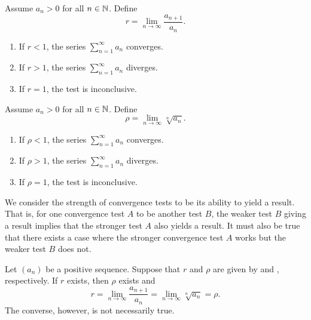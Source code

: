 \begin{proposition}
  Assume $a_n > 0$ for all $n \in \mathbb N$. Define
  \[ r = \lim_{n \to \infty} \frac{a_{n + 1}}{a_n}. \]
  \begin{enumerate}
    \item If $r < 1$, the series $\sum_{n = 1}^{\infty} a_n$ converges.
    \item If $r > 1$, the series $\sum_{n = 1}^{\infty} a_n$ diverges.
    \item If $r = 1$, the test is inconclusive.
  \end{enumerate}
\end{proposition}

\begin{proposition}
  Assume $a_n > 0$ for all $n \in \mathbb N$. Define
  \[ \rho = \lim_{n \to \infty} \sqrt[n]{a_n}. \]
  \begin{enumerate}
    \item If $\rho < 1$, the series $\sum_{n = 1}^{\infty} a_n$ converges.
    \item If $\rho > 1$, the series $\sum_{n = 1}^{\infty} a_n$ diverges.
    \item If $\rho = 1$, the test is inconclusive.
  \end{enumerate}
\end{proposition}

\begin{definition}
  We consider the strength of convergence tests to be its ability to
  yield a result. That is, for one convergence test $A$ to be
   another test $B$, the weaker test $B$
  giving a result implies that the stronger test $A$ also yields a
  result. It must also be true that there exists a case where the
  stronger convergence test $A$ works but the weaker test $B$ does not.
\end{definition}

\begin{proposition}
  Let $(a_n)$ be a positive sequence. Suppose that $r$ and $\rho$ are
  given by  and , respectively.
  If $r$ exists, then $\rho$ exists and
  \[ r = \lim_{n \to \infty} \frac{a_{n + 1}}{a_n} = \lim_{n \to
  \infty} \sqrt[n]{a_n} = \rho. \]
  The converse, however, is not necessarily true.
\end{proposition}

